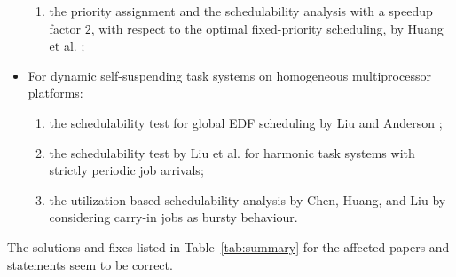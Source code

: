 \begin{itemize}
\begin{enumerate}
  \item the priority assignment and the schedulability analysis with a
    speedup factor $2$, with respect to the optimal fixed-priority
    scheduling, by Huang et
    al. \cite{huangpass:dac2015};
  \end{enumerate}
\item For dynamic self-suspending task systems on homogeneous multiprocessor
  platforms:
  \begin{enumerate}
  \item the schedulability test for global EDF scheduling by Liu and
    Anderson \cite{DBLP:conf/ecrts/LiuA13};
  \item the schedulability test by Liu et
    al. \cite{DBLP:conf/ecrts/LiuCH014} for harmonic task
    systems with strictly periodic job arrivals;
  \item the utilization-based schedulability analysis by Chen, Huang,
    and Liu \cite{ChenHLRTSS2015} by considering carry-in jobs as
    bursty behaviour.
  \end{enumerate}
\end{itemize}
The solutions and fixes listed in Table~\ref{tab:summary} for the
affected papers and statements seem to be correct.







